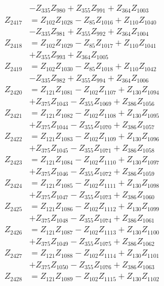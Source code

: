 \begin{multicols}{2}
\begin{align}
&- Z_{335}Z_{980} + Z_{355}Z_{991} + Z_{364}Z_{1003} \nonumber \\
Z_{2417} &= Z_{102}Z_{1028} - Z_{85}Z_{1016} + Z_{110}Z_{1040}  \nonumber \\
&- Z_{335}Z_{981} + Z_{355}Z_{992} + Z_{364}Z_{1004} \nonumber \\
Z_{2418} &= Z_{102}Z_{1029} - Z_{85}Z_{1017} + Z_{110}Z_{1041}  \nonumber \\
&+ Z_{355}Z_{993} + Z_{364}Z_{1005} \nonumber \\
Z_{2419} &= Z_{102}Z_{1030} - Z_{85}Z_{1018} + Z_{110}Z_{1042}  \nonumber \\
&- Z_{335}Z_{982} + Z_{355}Z_{994} + Z_{364}Z_{1006} \nonumber \\
Z_{2420} &= Z_{121}Z_{1081} - Z_{102}Z_{1107} + Z_{130}Z_{1094}  \nonumber \\
&+ Z_{375}Z_{1043} - Z_{355}Z_{1069} + Z_{386}Z_{1056} \nonumber \\
Z_{2421} &= Z_{121}Z_{1082} - Z_{102}Z_{1108} + Z_{130}Z_{1095}  \nonumber \\
&+ Z_{375}Z_{1044} - Z_{355}Z_{1070} + Z_{386}Z_{1057} \nonumber \\
Z_{2422} &= Z_{121}Z_{1083} - Z_{102}Z_{1109} + Z_{130}Z_{1096}  \nonumber \\
&+ Z_{375}Z_{1045} - Z_{355}Z_{1071} + Z_{386}Z_{1058} \nonumber \\
Z_{2423} &= Z_{121}Z_{1084} - Z_{102}Z_{1110} + Z_{130}Z_{1097}  \nonumber \\
&+ Z_{375}Z_{1046} - Z_{355}Z_{1072} + Z_{386}Z_{1059} \nonumber \\
Z_{2424} &= Z_{121}Z_{1085} - Z_{102}Z_{1111} + Z_{130}Z_{1098}  \nonumber \\
&+ Z_{375}Z_{1047} - Z_{355}Z_{1073} + Z_{386}Z_{1060} \nonumber \\
Z_{2425} &= Z_{121}Z_{1086} - Z_{102}Z_{1112} + Z_{130}Z_{1099}  \nonumber \\
&+ Z_{375}Z_{1048} - Z_{355}Z_{1074} + Z_{386}Z_{1061} \nonumber \\
Z_{2426} &= Z_{121}Z_{1087} - Z_{102}Z_{1113} + Z_{130}Z_{1100}  \nonumber \\
&+ Z_{375}Z_{1049} - Z_{355}Z_{1075} + Z_{386}Z_{1062} \nonumber \\
Z_{2427} &= Z_{121}Z_{1088} - Z_{102}Z_{1114} + Z_{130}Z_{1101}  \nonumber \\
&+ Z_{375}Z_{1050} - Z_{355}Z_{1076} + Z_{386}Z_{1063} \nonumber \\
Z_{2428} &= Z_{121}Z_{1089} - Z_{102}Z_{1115} + Z_{130}Z_{1102}  \nonumber \\

\end{align}
\end{multicols}
